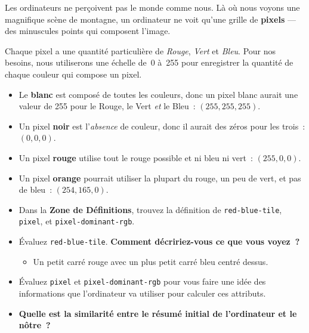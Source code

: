\documentclass[12pt,a4paper]{article}
\begin{document}
Les ordinateurs ne perçoivent pas le monde comme nous. Là où nous voyons une magnifique scène de montagne, un ordinateur ne voit qu'une grille de \textbf{pixels} — des minuscules points qui composent l'image.

Chaque pixel a une quantité particulière de \emph{Rouge}, \emph{Vert} et \emph{Bleu}. Pour nos besoins, nous utiliserons une échelle de~0 à~255 pour enregistrer la quantité de chaque couleur qui compose un pixel.

\begin{keypointbox}
  \begin{itemize}
    \item Le \textbf{blanc} est composé de toutes les couleurs, donc un pixel blanc aurait une valeur de 255 pour le Rouge, le Vert \emph{et} le Bleu~: $(255, 255, 255)$.
    \item Un pixel \textbf{noir} est l'\emph{absence} de couleur, donc il aurait des zéros pour les trois~: $(0, 0, 0)$.
    \item Un pixel \textbf{rouge} utilise tout le rouge possible et ni bleu ni vert~: $(255, 0, 0)$.
    \item Un pixel \textbf{orange} pourrait utiliser la plupart du rouge, un peu de vert, et pas de bleu~: $(254, 165, 0)$.
  \end{itemize}
\end{keypointbox}

\begin{activitybox}
  \begin{itemize}
    \item Dans la \textbf{Zone de Définitions}, trouvez la définition de \texttt{red\allowbreak-blue\allowbreak-tile}, \texttt{pixel}, et \texttt{pixel\allowbreak-dominant\allowbreak-rgb}.
    \item Évaluez \texttt{red\allowbreak-blue\allowbreak-tile}. \textbf{Comment décririez-vous ce que vous voyez~?}
    \begin{itemize}
      \item Un petit carré rouge avec un plus petit carré bleu centré dessus.
    \end{itemize}
    \item Évaluez \texttt{pixel} et \texttt{pixel\allowbreak-dominant\allowbreak-rgb} pour vous faire une idée des informations que l'ordinateur va utiliser pour calculer ces attributs.
    \item \textbf{ Quelle est la similarité entre le résumé initial de l'ordinateur et le nôtre~?}
  \end{itemize}
\end{activitybox}
\end{document}
